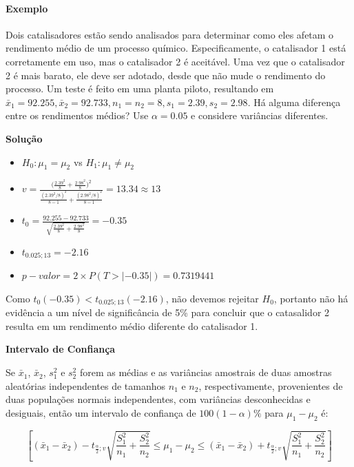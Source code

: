 \documentclass[
]{book}
\providecommand{\tightlist}{%
  \setlength{\itemsep}{0pt}\setlength{\parskip}{0pt}}
\begin{document}
\hypertarget{exemplo-13}{%
\paragraph{Exemplo}\label{exemplo-13}}

Dois catalisadores estão sendo analisados para determinar como eles afetam o rendimento médio de um processo químico. Especificamente, o catalisador 1 está corretamente em uso, mas o catalisador 2 é aceitável. Uma vez que o catalisador 2 é mais barato, ele deve ser adotado, desde que não mude o rendimento do processo. Um teste é feito em uma planta piloto, resultando em \(\bar x_1=92.255, \bar x_2=92.733, n_1=n_2=8, s_1=2.39, s_2=2.98\). Há alguma diferença entre os rendimentos médios? Use \(\alpha=0.05\) e considere variâncias diferentes.

\textbf{Solução}

\begin{itemize}
\tightlist
\item
  \(H_0: \mu_1=\mu_2\) vs \(H_1: \mu_1\ne\mu_2\)
\item
  \(v=\frac{\Big(\frac{2.39^2}{8}+\frac{2.98^2}{8}\Big)^2}{\frac{(2.39^2/8)^2}{8-1}+\frac{(2.98^2/8)^2}{8-1}}=13.34\approx13\)
\item
  \(t_0=\frac{92.255-92.733}{\sqrt{\frac{2.39^2}{8}+\frac{2.98^2}{8}}}=-0.35\)
\item
  \(t_{0.025;13}=-2.16\)
\item
  \(p-valor=2\times P(T>|-0.35|)=0.7319441\)
\end{itemize}

Como \(t_0(-0.35)<t_{0.025;13}(-2.16)\), não devemos rejeitar \(H_0\), portanto não há evidência a um nível de significância de 5\% para concluir que o catasalidor 2 resulta em um rendimento médio diferente do catalisador 1.

\textbf{Intervalo de Confiança}

Se \(\bar x_1\), \(\bar x_2\), \(s_1^2\) e \(s_2^2\) forem as médias e as variâncias amostrais de duas amostras aleatórias independentes de tamanhos \(n_1\) e \(n_2\), respectivamente, provenientes de duas populações normais independentes, com variâncias desconhecidas e desiguais, então um intervalo de confiança de \(100(1-\alpha)\%\) para \(\mu_1-\mu_2\) é:

\[\left[(\bar x_1-\bar x_2) -t_{\frac{\alpha}{2};v}\sqrt{\frac{S_1^2}{n_1}+\frac{S_2^2}{n_2}}\leq \mu_1-\mu_2 \leq (\bar x_1-\bar x_2) +t_{\frac{\alpha}{2};v}\sqrt{\frac{S_1^2}{n_1}+\frac{S_2^2}{n_2}}\right]\]
\end{document}
